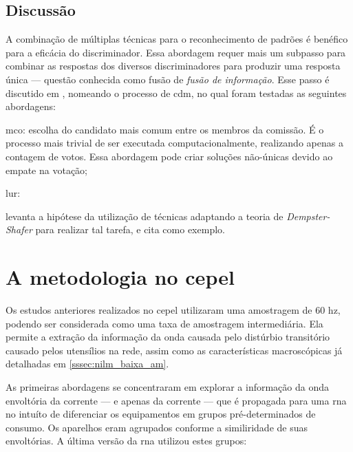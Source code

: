\subsection{Discussão}
\label{ssec:nilm_mundo_padroes}

A combinação de múltiplas técnicas para o reconhecimento de padrões é
benéfico para a eficácia do discriminador. Essa abordagem requer mais
um subpasso para combinar as respostas dos diversos discriminadores
para produzir uma resposta única --- questão conhecida como fusão de
\emph{fusão de informação}. Esse passo é discutido em
\cite{nilm_liang_pt1_2010_34}, nomeando o processo de \gls{cdm}, no
qual foram testadas as seguintes abordagens:

\begin{description}
\item \gls{mco}: escolha do candidato mais comum entre os
membros da comissão. É o processo mais trivial de ser executada
computacionalmente, realizando apenas a contagem de votos. Essa
abordagem pode criar soluções não-únicas devido ao empate na votação;
\item \gls{lur}:
\end{description}

\cite{nilm_zeifman_review_2011} levanta a hipótese da utilização de
técnicas adaptando a teoria de \emph{Dempster-Shafer} para realizar
tal tarefa, e cita \cite{information_fusion_basir_2007_40} como
exemplo. 
\cite{nilm_zeifman_review_2011} 

\section{A metodologia no \acrshort{cepel}}
\label{sec:nilm_cepel}

Os estudos anteriores realizados no \gls{cepel}
\cite{nilm_cepel_alvaro,nilm_cepel_bezerra,nilm_cepel_aguiar}
utilizaram uma amostragem de 60 \acrshort{hz}, podendo ser considerada
como uma taxa de amostragem intermediária. Ela permite a extração 
da informação da onda causada pelo distúrbio transitório causado pelos
utensílios na rede, assim como as características macroscópicas já
detalhadas em \ref{sssec:nilm_baixa_am}. 

As primeiras abordagens se concentraram em explorar a informação da
onda envoltória da corrente --- e apenas da corrente --- que é
propagada para uma \gls{rna} no intuíto de diferenciar os equipamentos
em grupos pré-determinados de consumo. Os aparelhos eram agrupados
conforme a similiridade de suas envoltórias. A última versão da
\gls{rna} utilizou estes grupos:

